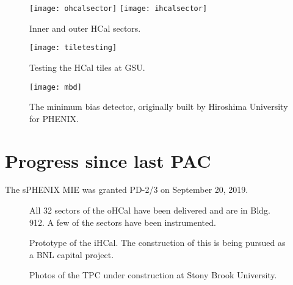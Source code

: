 \begin{figure}[hbt!]
  \centering
  \texttt{[image: ohcalsector]}
  \hfill
  \texttt{[image: ihcalsector]}
  \caption{Inner and outer HCal sectors.}
  \label{fig:hcal}
\end{figure}

\begin{figure}[hbt!]
  \centering
  \texttt{[image: tiletesting]}
  \caption{Testing the HCal tiles at GSU.}
  \label{fig:tiletesting}
\end{figure}

\begin{figure}[hbt!]
  \centering
  \texttt{[image: mbd]}
  \caption{The minimum bias detector, originally built by Hiroshima
    University for PHENIX.}
  \label{fig:mbd}
\end{figure}




\section{Progress since last PAC}
\label{sec:progress}

The sPHENIX MIE was granted PD-2/3 on September 20, 2019.

\begin{figure}[!hbt]
 \begin{center}
        \caption{\label{fig:ohcal}All 32 sectors of the oHCal have
        been delivered and are in Bldg. 912.  A few of the sectors have
        been instrumented.}
 \end{center}
\end{figure}

\begin{figure}[!hbt]
 \begin{center}
        \caption{\label{fig:ihcal}Prototype of the iHCal.  The
        construction of this is being pursued as a BNL capital project.}
 \end{center}
\end{figure}

\begin{figure}[!hbt]
 \begin{center}
        \caption{\label{fig:tpc}Photos of the TPC under construction
        at Stony Brook University.}
 \end{center}
\end{figure}

